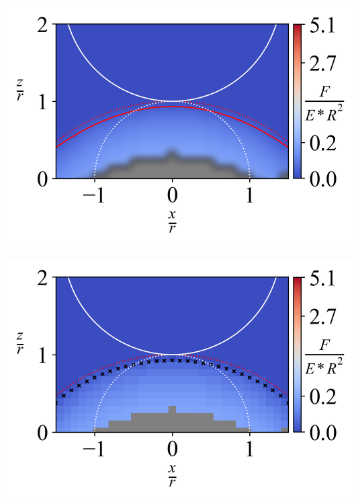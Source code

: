 \begin{figure}[H]
    \begin{subfigure}{0.32\textwidth}
        \centering
        \caption{\label{fig: All-Hemisphere-ContourPlot-7}}
        \includegraphics[width=1\linewidth]{Figures/Hemisphere-ContourPlot-7.png}
    \end{subfigure}  
    \hfill  
    \begin{subfigure}{0.32\textwidth}
        \centering
        \caption{\label{fig: All-Hemisphere-ContourPlotNI-7}}
        \includegraphics[width=1\linewidth]{Figures/Hemisphere-ContourPlotNI-7.png}
    \end{subfigure}  
    \hfill  
    \begin{subfigure}{0.32\textwidth}
        \centering
        \caption{\label{fig: All-Hemisphere-LineContour-7}}

\end{subfigure}
\end{figure}
